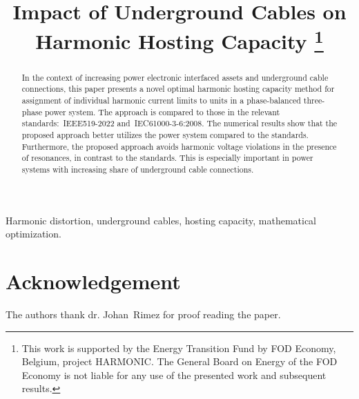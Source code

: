 \documentclass[conference]{IEEEtran}
\begin{document}
\title{Impact of Underground Cables on Harmonic Hosting Capacity
\thanks{This work is supported by the Energy Transition Fund by FOD Economy, Belgium, project HARMONIC. The General Board on Energy of the FOD Economy is not liable for any use of the presented work and subsequent results.}}

\author{
\IEEEauthorblockA{\textit{Department of Technology Expertise Power} \\
\textit{BASF Antwerp}\\
Antwerp, Belgium %
}
\and
{}
}

\maketitle

\begin{abstract}
In the context of increasing power electronic interfaced assets and underground cable connections, this paper presents a novel optimal harmonic hosting capacity method for  assignment of individual harmonic current limits to units in a phase-balanced three-phase power system. The approach is compared to those in the relevant standards:~IEEE519-2022 and~IEC61000-3-6:2008. The numerical results show that the proposed approach better utilizes the power system compared to the standards. Furthermore, the proposed approach avoids harmonic voltage violations in the presence of resonances, in contrast to the standards. This is especially important in power systems with increasing share of underground cable connections.
\end{abstract}

\begin{IEEEkeywords}
Harmonic distortion, underground cables, hosting capacity, mathematical optimization.
\end{IEEEkeywords}






\section*{Acknowledgement}
The authors thank dr. Johan~Rimez for proof reading the paper.



\end{document}
